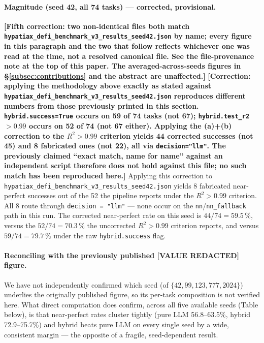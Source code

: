 \documentclass[twoside,11pt]{article}
\newcommand{\Rsq}{R^{2}}
\begin{document}
\paragraph{Magnitude (seed 42, all 74 tasks) --- \textbf{corrected,
provisional}.}
\textbf{[Fifth correction: two non-identical files both match
\texttt{hypatiax\_defi\_benchmark\_v3\_results\_seed42.json} by name; every
figure in this paragraph and the two that follow reflects whichever one
was read at the time, not a resolved canonical file. See the
file-provenance note at the top of this paper. The averaged-across-seeds
figures in \S\ref{subsec:contributions} and the abstract are unaffected.]}
\textbf{[Correction: applying the methodology above exactly as stated
against \texttt{hypatiax\_defi\_benchmark\_v3\_results\_seed42.json}
reproduces different numbers from those previously printed in this
section. \texttt{hybrid.success=True} occurs on 59 of 74 tasks (not 67);
\texttt{hybrid.test\_r2}$>0.99$ occurs on 52 of 74 (not 67 either).
Applying the (a)+(b) correction to the $\Rsq>0.99$ criterion yields 44
corrected successes (not 45) and 8 fabricated ones (not 22), all via
\texttt{decision="llm"}. The previously claimed ``exact match, name for
name'' against an independent script therefore does not hold against
this file; no such match has been reproduced here.]}
Applying this correction to
\texttt{hypatiax\_defi\_benchmark\_v3\_results\_seed42.json} yields 8
fabricated near-perfect successes out of the 52 the pipeline reports
under the $\Rsq>0.99$ criterion. All 8 route through
\texttt{decision = "llm"} --- none occur on the
\texttt{nn}/\texttt{nn\_fallback} path in this run. The corrected
near-perfect rate on this seed is $44/74 = 59.5\,\%$, versus the
$52/74 = 70.3\,\%$ the uncorrected $\Rsq>0.99$ criterion reports, and
versus $59/74=79.7\,\%$ under the raw \texttt{hybrid.success} flag.

\paragraph{Reconciling with the previously published \textbf{[VALUE REDACTED]}
figure.} We have not independently confirmed which seed (of $\{42, 99,
123, 777, 2024\}$) underlies the originally published figure, so its
per-task composition is not verified here. What direct computation
does confirm, across all five available seeds (Table below), is that
near-perfect rates cluster tightly (pure LLM 56.8--63.5\%, hybrid
72.9--75.7\%) and hybrid beats pure LLM on every single seed by a wide,
consistent margin --- the opposite of a fragile, seed-dependent result.
\end{document}
